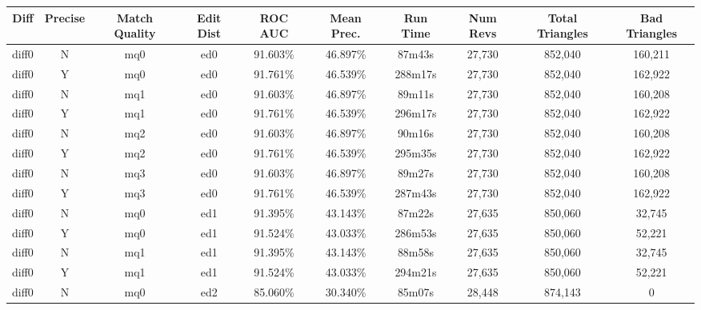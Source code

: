 \begin{sidewaystable}[!tp]
  \begin{center}
    \begin{tabular}{|c|c|c|c||c|c||c|c|c|c|}
\hline
Diff & Precise & Match Quality & Edit Dist
	& ROC AUC & Mean Prec.
	& Run Time & Num Revs
	& Total Triangles & Bad Triangles \\
\hline
\hline
diff0 & N & mq0 & ed0
	& 91.603\% & 46.897\%
	& 87m43s & 27,730
	& 852,040 & 160,211 \\
diff0 & Y & mq0 & ed0
	& 91.761\% & 46.539\%
	& 288m17s & 27,730
	& 852,040 & 162,922 \\
diff0 & N & mq1 & ed0
	& 91.603\% & 46.897\%
	& 89m11s & 27,730
	& 852,040 & 160,208 \\
diff0 & Y & mq1 & ed0
	& 91.761\% & 46.539\%
	& 296m17s & 27,730
	& 852,040 & 162,922 \\
diff0 & N & mq2 & ed0
	& 91.603\% & 46.897\%
	& 90m16s & 27,730
	& 852,040 & 160,208 \\
diff0 & Y & mq2 & ed0
	& 91.761\% & 46.539\%
	& 295m35s & 27,730
	& 852,040 & 162,922 \\
diff0 & N & mq3 & ed0
	& 91.603\% & 46.897\%
	& 89m27s & 27,730
	& 852,040 & 160,208 \\
diff0 & Y & mq3 & ed0
	& 91.761\% & 46.539\%
	& 287m43s & 27,730
	& 852,040 & 162,922 \\
diff0 & N & mq0 & ed1
	& 91.395\% & 43.143\%
	& 87m22s & 27,635
	& 850,060 & 32,745 \\
diff0 & Y & mq0 & ed1
	& 91.524\% & 43.033\%
	& 286m53s & 27,635
	& 850,060 & 52,221 \\
diff0 & N & mq1 & ed1
	& 91.395\% & 43.143\%
	& 88m58s & 27,635
	& 850,060 & 32,745 \\
diff0 & Y & mq1 & ed1
	& 91.524\% & 43.033\%
	& 294m21s & 27,635
	& 850,060 & 52,221 \\
diff0 & N & mq0 & ed2
	& 85.060\% & 30.340\%
	& 85m07s & 28,448
	& 874,143 & 0 \\

\end{tabular}
\end{center}
\end{sidewaystable}
